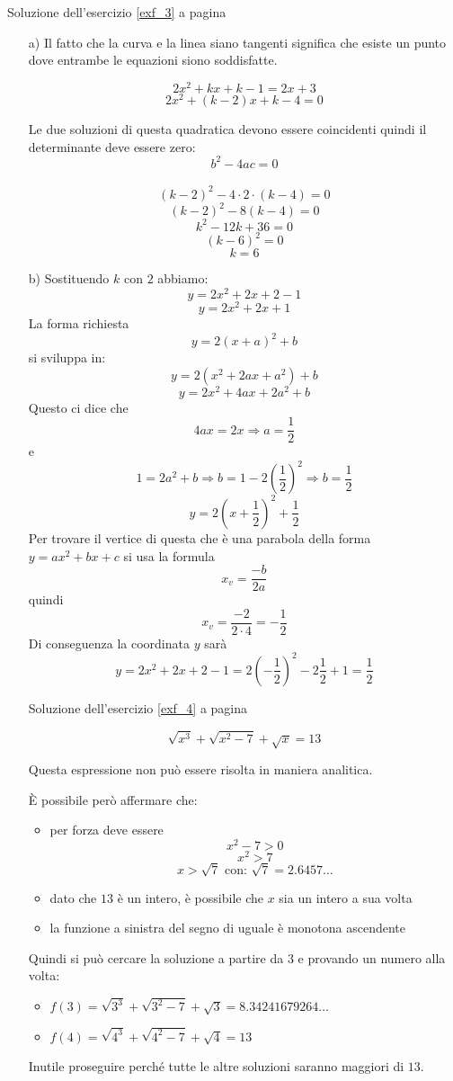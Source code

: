 Soluzione dell'esercizio \ref{exf_3} a pagina \pageref{exf_3}\label{solf_3}

\begin{enumerate}
\item[a)] Il fatto che la curva e la linea siano tangenti significa che esiste
un punto dove entrambe le equazioni siono soddisfatte.

\[2x^2+kx+k-1=2x+3\]
\[2x^2+(k-2)x+k-4=0\]

Le due soluzioni di questa quadratica devono essere coincidenti quindi il 
determinante deve essere zero:\[b^2-4ac=0\]\
\[(k-2)^2-4\cdot 2\cdot(k-4)=0\]
\[(k-2)^2-8(k-4)=0\]
\[k^2-12k+36=0\]
\[(k-6)^2=0\]
\[k=6\]
\item[b)]
Sostituendo $k$ con $2$ abbiamo:
\[y=2x^2+2x+2-1\]
\[y=2x^2+2x+1\]
La forma richiesta
\[y=2(x+a)^2+b\]
si sviluppa in:
\[y=2(x^2 +2ax+a^2)+b\]
\[y=2x^2 +4ax+2a^2+b\]
Questo ci dice che
\[4ax=2x \Rightarrow a=\frac{1}{2}\] e
\[1=2a^2+b \Rightarrow  b=1-2\left(\frac{1}{2}\right)^2 \Rightarrow b=\frac{1}{2}\]
\[y=2\left(x+\frac{1}{2}\right)^2+\frac{1}{2}\]
Per trovare il vertice di questa che è una parabola della forma $y=ax^2+bx+c$ si usa la formula 
\[x_v=\frac{-b}{2a}\]
quindi
\[x_v=\frac{-2}{2\cdot4}=-\frac{1}{2}\]
Di conseguenza la coordinata $y$ sarà
\[y=2x^2+2x+2-1=2\left(-\frac{1}{2}\right)^2-2\frac{1}{2}+1 = \frac{1}{2}\]

Soluzione dell'esercizio \ref{exf_4} a pagina \pageref{exf_4}\label{solf_4}


\[ \sqrt{x^3}+\sqrt{x^2-7}+\sqrt{x}=13 \]

Questa espressione non può essere risolta in maniera analitica.

È possibile però affermare che:
\begin{itemize}
\item per forza deve essere 
\[ x^2-7 > 0 \]
\[ x^2>7 \]
\[ x>\sqrt{7} \textrm{ con: } \sqrt{7}=2.6457\dots \]
\item dato che $13$ è un intero, è possibile che $x$ sia un intero a sua volta
\item la funzione a sinistra del segno di uguale è monotona ascendente
\end{itemize}

Quindi si può cercare la soluzione a partire da $3$ e 
provando un numero alla volta:

\begin{itemize}
\item $f(3)=\sqrt{3^3}+\sqrt{3^2-7}+\sqrt{3} = 8.34241679264 \dots$
\item $f(4)= \sqrt{4^3}+\sqrt{4^2-7}+\sqrt{4} =  13 $
\end{itemize}

Inutile proseguire perché tutte le altre soluzioni saranno maggiori di $13$.



\end{enumerate}
